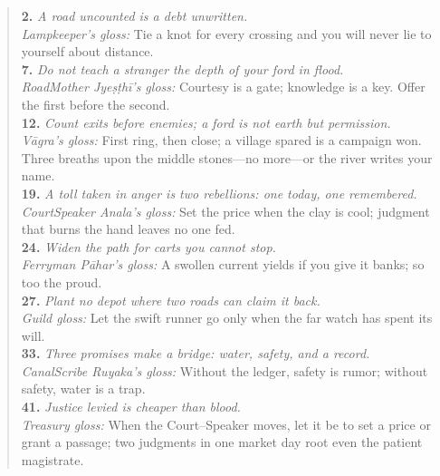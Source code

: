 \documentclass[11pt]{article}
\begin{document}
\begin{quote}\small
\textbf{2.} \emph{A road uncounted is a debt unwritten.}\\
\textit{Lampkeeper’s gloss:} Tie a knot for every crossing and you will never lie to yourself about distance.\\[0.35em]

\textbf{7.} \emph{Do not teach a stranger the depth of your ford in flood.}\\
\textit{Road\textendash Mother Jyeṣṭhī’s gloss:} Courtesy is a gate; knowledge is a key. Offer the first before the second.\\[0.35em]

\textbf{12.} \emph{Count exits before enemies; a ford is not earth but permission.}\\
\textit{Vāgra’s gloss:} First ring, then close; a village spared is a campaign won. Three breaths upon the middle stones—no more—or the river writes your name.\\[0.35em]

\textbf{19.} \emph{A toll taken in anger is two rebellions: one today, one remembered.}\\
\textit{Court\textendash Speaker Anala’s gloss:} Set the price when the clay is cool; judgment that burns the hand leaves no one fed.\\[0.35em]

\textbf{24.} \emph{Widen the path for carts you cannot stop.}\\
\textit{Ferryman Pāhar’s gloss:} A swollen current yields if you give it banks; so too the proud.\\[0.35em]

\textbf{27.} \emph{Plant no depot where two roads can claim it back.}\\
\textit{Guild gloss:} Let the swift runner go only when the far watch has spent its will.\\[0.35em]

\textbf{33.} \emph{Three promises make a bridge: water, safety, and a record.}\\
\textit{Canal\textendash Scribe Ruyaka’s gloss:} Without the ledger, safety is rumor; without safety, water is a trap.\\[0.35em]

\textbf{41.} \emph{Justice levied is cheaper than blood.}\\
\textit{Treasury gloss:} When the Court–Speaker moves, let it be to set a price or grant a passage; two judgments in one market day root even the patient magistrate.\\[0.35em]


\end{quote}
\end{document}
